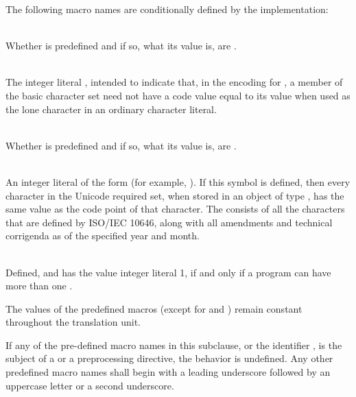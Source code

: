 \pnum
The following macro names are conditionally defined by the implementation:
\begin{description}
\item
{}%
\\
Whether  is predefined and if so, what its value is,
are .

\item
{}%
\\
The integer literal , intended to indicate that, in the encoding for
, a member of the basic character set need not have a code value equal to
its value when used as the lone character in an ordinary character literal.

\item
{}%
\\
Whether  is predefined and if so, what its value is,
are .

\item
{}%
\\
An integer literal of the form  (for example,
).
If this symbol is defined, then every character in the Unicode required set, when
stored in an object of type , has the same value as the code point
of that character. The  consists of all
the characters that are defined by ISO/IEC 10646, along with
all amendments and technical corrigenda as of the specified year and month.

\item
{}%
\\
Defined, and has the value integer literal 1, if and only if a program
can have more than one .
\end{description}

\pnum
The values of the predefined macros
(except for
and
)
remain constant throughout the translation unit.

\pnum
If any of the pre-defined macro names in this subclause,
or the identifier
,
is the subject of a
or a
preprocessing directive,
the behavior is undefined.
Any other predefined macro names shall begin with a
leading underscore followed by an uppercase letter or a second
underscore.

